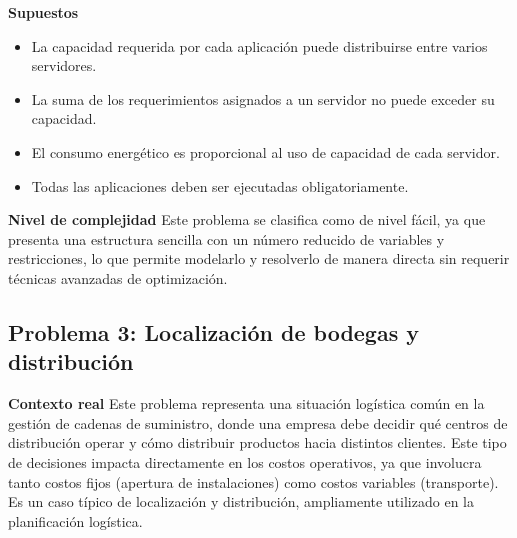 \documentclass[12pt,letterpaper]{article}
\begin{document}
\textbf{Supuestos}
\begin{itemize}[leftmargin=*]
	\item La capacidad requerida por cada aplicación puede distribuirse entre varios servidores.
	\item La suma de los requerimientos asignados a un servidor no puede exceder su capacidad.
	\item El consumo energético es proporcional al uso de capacidad de cada servidor.
	\item Todas las aplicaciones deben ser ejecutadas obligatoriamente.
\end{itemize}

\textbf{Nivel de complejidad} Este problema se clasifica como de nivel fácil, ya que presenta una estructura sencilla con un número reducido de variables y restricciones, lo que permite modelarlo y resolverlo de manera directa sin requerir técnicas avanzadas de optimización.

\subsection{Problema 3: Localización de bodegas y distribución}

\textbf{Contexto real} Este problema representa una situación logística común en la gestión de cadenas de suministro, donde una empresa debe decidir qué centros de distribución operar y cómo distribuir productos hacia distintos clientes. Este tipo de decisiones impacta directamente en los costos operativos, ya que involucra tanto costos fijos (apertura de instalaciones) como costos variables (transporte). Es un caso típico de localización y distribución, ampliamente utilizado en la planificación logística.
\end{document}
